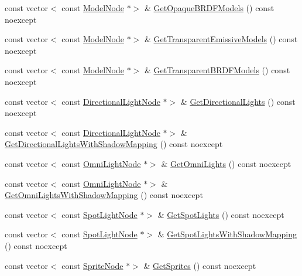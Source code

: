 \begin{DoxyCompactItemize}
\item 
const vector$<$ const \hyperlink{classmage_1_1_model_node}{Model\+Node} $\ast$$>$ \& \hyperlink{structmage_1_1_pass_buffer_a75539c1d2349b864b54495c9757ada74}{Get\+Opaque\+B\+R\+D\+F\+Models} () const noexcept
\item 
const vector$<$ const \hyperlink{classmage_1_1_model_node}{Model\+Node} $\ast$$>$ \& \hyperlink{structmage_1_1_pass_buffer_af51d15e8ec6230a6f17644ec2d1b6feb}{Get\+Transparent\+Emissive\+Models} () const noexcept
\item 
const vector$<$ const \hyperlink{classmage_1_1_model_node}{Model\+Node} $\ast$$>$ \& \hyperlink{structmage_1_1_pass_buffer_a8d21b9d7a68d56c5833f814ce0b6b0db}{Get\+Transparent\+B\+R\+D\+F\+Models} () const noexcept
\item 
const vector$<$ const \hyperlink{namespacemage_a7637b5351fc0f66a10badd80ebb35899}{Directional\+Light\+Node} $\ast$$>$ \& \hyperlink{structmage_1_1_pass_buffer_a23f032aeb9541e26997fb7009473ae3d}{Get\+Directional\+Lights} () const noexcept
\item 
const vector$<$ const \hyperlink{namespacemage_a7637b5351fc0f66a10badd80ebb35899}{Directional\+Light\+Node} $\ast$$>$ \& \hyperlink{structmage_1_1_pass_buffer_aaa5990e167c1f729f7c83bc4b12848cb}{Get\+Directional\+Lights\+With\+Shadow\+Mapping} () const noexcept
\item 
const vector$<$ const \hyperlink{namespacemage_a1724c6e6b6b5ba535cdd967cbbb4a669}{Omni\+Light\+Node} $\ast$$>$ \& \hyperlink{structmage_1_1_pass_buffer_a9d085a3784f6e64777b720c8702e2f3e}{Get\+Omni\+Lights} () const noexcept
\item 
const vector$<$ const \hyperlink{namespacemage_a1724c6e6b6b5ba535cdd967cbbb4a669}{Omni\+Light\+Node} $\ast$$>$ \& \hyperlink{structmage_1_1_pass_buffer_a678adead392b68b985437d3147a6fd38}{Get\+Omni\+Lights\+With\+Shadow\+Mapping} () const noexcept
\item 
const vector$<$ const \hyperlink{namespacemage_aeed5dee4ff6c591eabb0e9114256df4a}{Spot\+Light\+Node} $\ast$$>$ \& \hyperlink{structmage_1_1_pass_buffer_a73b50abb85924fcd1f52239ab7e3ecda}{Get\+Spot\+Lights} () const noexcept
\item 
const vector$<$ const \hyperlink{namespacemage_aeed5dee4ff6c591eabb0e9114256df4a}{Spot\+Light\+Node} $\ast$$>$ \& \hyperlink{structmage_1_1_pass_buffer_a8f290f22cc01bbb4ec7f0986e0e0f3a1}{Get\+Spot\+Lights\+With\+Shadow\+Mapping} () const noexcept
\item 
const vector$<$ const \hyperlink{classmage_1_1_sprite_node}{Sprite\+Node} $\ast$$>$ \& \hyperlink{structmage_1_1_pass_buffer_a0ac14b71c0af69e946a37b4c2873d783}{Get\+Sprites} () const noexcept

\end{DoxyCompactItemize}
